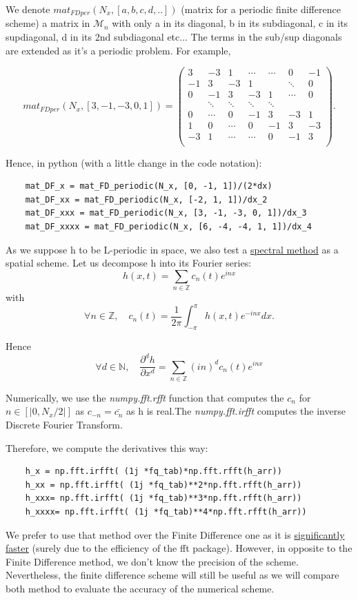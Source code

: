 \documentclass[12pt]{article}
\begin{document}
We denote $ mat_{FDper}(N_x, [a, b, c, d,..])$ (matrix for a periodic finite difference scheme) a matrix in $\mathcal{M}_n$ with only a in its diagonal, b in its subdiagonal, c in its supdiagonal, d in its 2nd subdiagonal etc... The terms in the sub/sup diagonals are extended as it's a periodic problem. For example, 

\begin{equation}
mat_{FDper}(N_x, [3, -1, -3,0,1]) = \begin{pmatrix} 3&-3&1&\cdots&\cdots&0&-1\\-1&3&-3&1&&\ddots&0\\0&-1&3&-3&1&\cdots&0\\&\ddots&\ddots&\ddots&\ddots&\\0&\cdots&0&-1&3&-3&1\\1&0&\cdots&0&-1&3&-3\\-3&1&\cdots&\cdots&0&-1&3\\\end{pmatrix}.
\end{equation}


Hence, in python (with a little change in the code notation): 
\begin{verbatim}
    mat_DF_x = mat_FD_periodic(N_x, [0, -1, 1])/(2*dx)
    mat_DF_xx = mat_FD_periodic(N_x, [-2, 1, 1])/dx_2
    mat_DF_xxx = mat_FD_periodic(N_x, [3, -1, -3, 0, 1])/dx_3
    mat_DF_xxxx = mat_FD_periodic(N_x, [6, -4, -4, 1, 1])/dx_4
\end{verbatim}

\vspace{0.5cm}

As we suppose h to be L-periodic in space, we also test a \underline{spectral method} as a spatial scheme. Let us decompose h into its Fourier series: $$h(x, t) = \sum_{n\in \mathbb{Z}} c_n(t)e^{inx}$$
with $$\forall n \in \mathbb{Z}, \quad c_n(t) = \frac{1}{2\pi}\int_{-\pi}^{\pi}h(x,t) e^{-inx}dx.$$

Hence $$\forall d \in \mathbb{N},\quad \frac{\partial^d h}{\partial x^d} = \sum_{n\in \mathbb{Z}} (in)^dc_n(t)e^{inx}$$ 

Numerically, we use the \textit{numpy.fft.rfft} function that computes the $c_n$ for $n\in [|0,N_x/2|]$ as $c_{-n} = \bar{c_n}$ as h is real.The \textit{numpy.fft.irfft} computes the inverse Discrete Fourier Transform.

Therefore, we compute the derivatives this way:
\begin{verbatim}
    h_x = np.fft.irfft( (1j *fq_tab)*np.fft.rfft(h_arr))
    h_xx = np.fft.irfft( (1j *fq_tab)**2*np.fft.rfft(h_arr))
    h_xxx= np.fft.irfft( (1j *fq_tab)**3*np.fft.rfft(h_arr))
    h_xxxx= np.fft.irfft( (1j *fq_tab)**4*np.fft.rfft(h_arr))
\end{verbatim}
We prefer to use that method over the Finite Difference one as it is \underline{significantly faster} (surely due to the efficiency of the fft package). However, in opposite to the Finite Difference method, we don't know the precision of the scheme. Nevertheless, the finite difference scheme will still be useful as we will compare both method to evaluate the accuracy of the numerical scheme. 
\\
\end{document}
